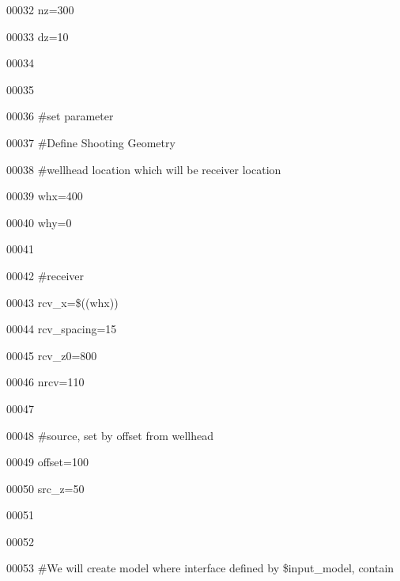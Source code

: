 \documentclass{article}
\begin{document}
\vspace{4pt}
00032 nz=300

\vspace{4pt}
00033 dz=10

\vspace{4pt}
00034 

\vspace{4pt}
00035 

\vspace{4pt}
00036 \#set parameter

\vspace{4pt}
00037 \#Define Shooting Geometry

\vspace{4pt}
00038 \#wellhead location which will be receiver location

\vspace{4pt}
00039 whx=400

\vspace{4pt}
00040 why=0

\vspace{4pt}
00041 

\vspace{4pt}
00042 \#receiver\label{l00043}

\vspace{4pt}
00043 rcv\_x=\$((whx))\label{l00044}

\vspace{4pt}
00044 rcv\_spacing=15\label{l00045}

\vspace{4pt}
00045 rcv\_z0=800 \label{l00046}

\vspace{4pt}
00046 nrcv=110\label{l00047}

\vspace{4pt}
00047 \label{l00048}

\vspace{4pt}
00048 \#source, set by offset from wellhead\label{l00049}

\vspace{4pt}
00049 offset=100\label{l00050}

\vspace{4pt}
00050 src\_z=50\label{l00051}

\vspace{4pt}
00051 \label{l00052}

\vspace{4pt}
00052 \label{l00053}

\vspace{4pt}
00053 \#We will create model where interface defined by \$input\_model, contain 
\end{document}
